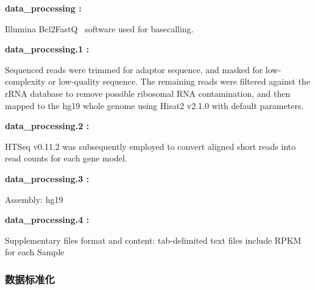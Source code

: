 \documentclass[
]{article}
\begin{document}
\begin{center}\begin{tcolorbox}[colback=gray!10, colframe=gray!50, width=0.9\linewidth, arc=1mm, boxrule=0.5pt]
\textbf{
data\_processing
:}

\vspace{0.5em}

    Illumina Bcl2FastQ  software used for basecalling.

\vspace{2em}


\textbf{
data\_processing.1
:}

\vspace{0.5em}

    Sequenced reads were trimmed for adaptor sequence, and
masked for low-complexity or low-quality sequence. The
remaining reads were filtered against the rRNA database to
remove possible ribosomal RNA contamination, and then
mapped to the hg19 whole genome using Hisat2 v2.1.0 with
default parameters.

\vspace{2em}


\textbf{
data\_processing.2
:}

\vspace{0.5em}

    HTSeq v0.11.2 was subsequently employed to convert
aligned short reads into read counts for each gene model.

\vspace{2em}


\textbf{
data\_processing.3
:}

\vspace{0.5em}

    Assembly: hg19

\vspace{2em}


\textbf{
data\_processing.4
:}

\vspace{0.5em}

    Supplementary files format and content: tab-delimited
text files include RPKM for each Sample

\vspace{2em}
\end{tcolorbox}
\end{center}

\hypertarget{ux6570ux636eux6807ux51c6ux5316}{%
\subsubsection{数据标准化}\label{ux6570ux636eux6807ux51c6ux5316}}
\end{document}
